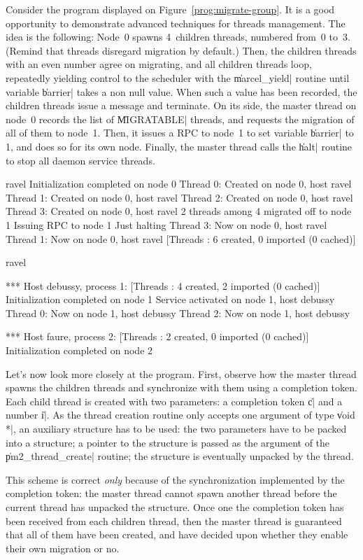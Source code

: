 Consider the program displayed on Figure~\ref{prog:migrate-group}. It
is a good opportunity to demonstrate advanced techniques for threads
management. The idea is the following: Node~0 spawns 4~children
threads, numbered from~0 to~3. (Remind that threads disregard
migration by default.)  Then, the children threads with an even number
agree on migrating, and all children threads loop, repeatedly yielding
control to the scheduler with the \|marcel_yield| routine until variable
\|barrier| takes a non null value.  When such a value has been
recorded, the children threads issue a message and terminate. On its
side, the master thread on node~0 records the list of \|MIGRATABLE|
threads, and requests the migration of all of them to node~1. Then, it
issues a RPC to node~1 to set variable \|barrier| to 1, and does so
for its own node. Finally, the master thread calls the \|halt| routine
to stop all daemon service threads.
\begin{shell}
ravel%
Initialization completed on node 0
Thread 0: Created on node 0, host ravel
Thread 1: Created on node 0, host ravel
Thread 2: Created on node 0, host ravel
Thread 3: Created on node 0, host ravel
2 threads among 4 migrated off to node 1
Issuing RPC to node 1
Just halting
Thread 3: Now on node 0, host ravel
Thread 1: Now on node 0, host ravel
[Threads : 6 created, 0 imported (0 cached)]

ravel%

*** Host debussy, process 1:
[Threads : 4 created, 2 imported (0 cached)]
Initialization completed on node 1
Service activated on node 1, host debussy
Thread 0: Now on node 1, host debussy
Thread 2: Now on node 1, host debussy

*** Host faure, process 2:
[Threads : 2 created, 0 imported (0 cached)]
Initialization completed on node 2
\end{shell}

Let's now look more closely at the program. First, observe how the
master thread spawns the children threads and synchronize with them
using a completion token. Each child thread is created with two
parameters: a completion token \|c| and a number \|i|. As the thread
creation routine only accepts one argument of type \|void *|, an
auxiliary structure has to be used: the two parameters have to be
packed into a structure; a pointer to the structure is passed as the
argument of the \|pm2_thread_create| routine; the structure is
eventually unpacked by the thread. 

\begin{warning}
  This scheme is correct \emph{only} because of the synchronization
  implemented by the completion token: the master thread cannot spawn
  another thread before the current thread has unpacked the structure.
  Once one the completion token has been received from each children
  thread, then the master thread is guaranteed that all of them have
  been created, and have decided upon whether they enable their own
  migration or no.
\end{warning}

